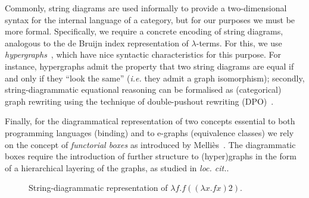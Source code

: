 Commonly, string diagrams are used informally to provide a two-dimensional syntax for the internal language of a category, but for our purposes we must be more formal. 
Specifically, we require a concrete encoding of string diagrams, analogous to the de Bruijn index representation of $\lambda$-terms.
For this, we use \emph{hypergraphs}~\cite{bonchi_string_2022-1}, which have nice syntactic characteristics for this purpose.
For instance, hypergraphs admit the property that two string diagrams are equal if and only if they ``look the same'' (\emph{i.e.} they admit a graph isomorphism); secondly, string-diagrammatic equational reasoning can be formalised as (categorical) graph rewriting using the technique of double-pushout rewriting (DPO)~\cite{1011453502719}. 

Finally, for the diagrammatical representation of two concepts essential to both programming languages (binding) and to e-graphs (equivalence classes) we rely on the concept of \emph{functorial boxes} as introduced by Melli\`es~\cite{10.1007/11874683_1}. 
The diagrammatic boxes require the introduction of further structure to (hyper)graphs in the form of a hierarchical layering of the graphs, as studied in \emph{loc. cit.}.

\begin{figure}
  \centering
\caption{String-diagrammatic representation of $\lambda f . f ((\lambda x . f x) 2)$.}\label{fig:de-brujin-string}
\end{figure}

